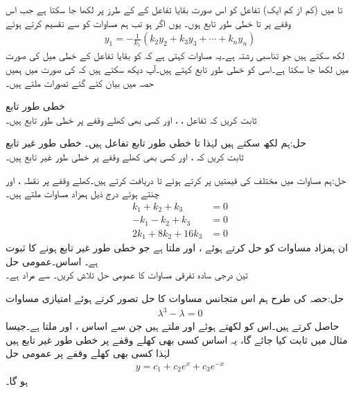  تا  میں (کم از کم ایک) تفاعل کو اس صورت بقایا تفاعل کے  کے طرز پر لکھا جا سکتا ہے جب اس وقفے پر  تا  خطی طور تابع ہوں۔ یوں اگر  ہو تب ہم مساوات  کو  سے تقسیم کرتے ہوئے
\begin{align*}
y_1=-\frac{1}{k_1}(k_2 y_2+k_3y_3+\cdots+k_ny_n)
\end{align*}
 لکھ سکتے ہیں جو تناسبی رشتہ ہے۔یہ مساوات کہتی ہے کہ  کو بقایا تفاعل کے خطی میل کی صورت میں لکھا جا سکتا ہے۔اسی کو خطی طور تابع کہتے ہیں۔آپ دیکھ سکتے ہیں کہ  کی صورت میں ہمیں حصہ  میں بیان کئے گئے تصورات ملتے ہیں۔

\quad خطی طور تابع\\
ثابت کریں کہ تفاعل ، ،  اور  کسی بھی کھلے وقفے پر خطی طور تابع ہیں۔

حل:ہم  لکھ سکتے ہیں لہٰذا  تا  خطی طور تابع تفاعل ہیں۔
\quad خطی طور غیر تابع\\
ثابت کریں کہ ،  اور   کسی بھی کھلے وقفے پر خطی طور غیر تابع ہیں۔

حل:ہم  مساوات  میں مختلف  کی قیمتیں پر کرتے ہوئے  تا  دریافت کرتے ہیں۔کھلے وقفے پر نقطہ ،  اور  چنتے ہوئے درج ذیل ہمزاد مساوات ملتے ہیں۔
\begin{align*}
k_1+k_2+k_3&=0\\
-k_1-k_2+k_3&=0\\
2k_1+8k_2+16k_3&=0
\end{align*}
ان ہمزاد مساوات کو حل کرتے ہوئے ،  اور  ملتا ہے جو خطی طور غیر تابع ہونے کا ثبوت ہے۔
\quad اساس۔عمومی حل\\
تین درجی سادہ تفرقی مساوات  کا عمومی حل تلاش کریں۔  سے مراد  ہے۔

حل:حصہ  کی طرح ہم اس متجانس مساوات کا حل  تصور کرتے  ہوئے امتیازی مساوات
\begin{align*}
\lambda^3-\lambda=0
\end{align*}
حاصل کرتے ہیں۔اس کو  لکھتے ہوئے  اور  ملتے ہیں جن سے اساس ،  اور  ملتا ہے۔جیسا مثال  میں ثابت کیا جائے گا، یہ اساس کسی بھی کھلے وقفے پر خطی طور غیر تابع ہیں لہٰذا کسی بھی کھلے وقفے پر  عمومی حل 
\begin{align*}
y=c_1+c_2e^x+c_3e^{-x}
\end{align*}
ہو گا۔

